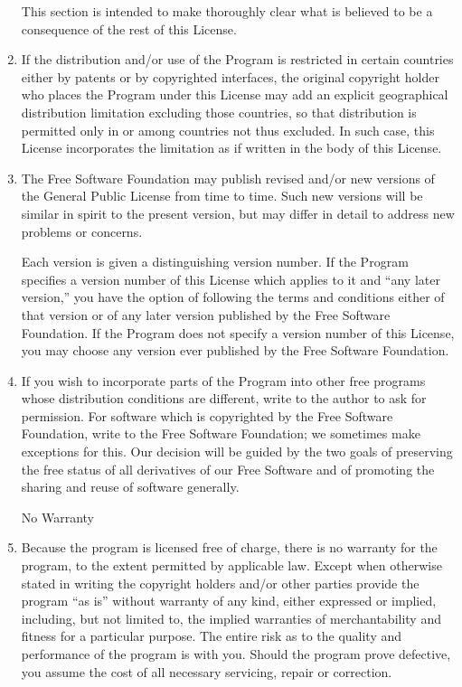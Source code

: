 \documentclass[11pt, letterpaper]{book}
\begin{document}
\begin{enumerate}
This section is intended to make thoroughly clear what is believed to
be a consequence of the rest of this License.

\item
If the distribution and/or use of the Program is restricted in
certain countries either by patents or by copyrighted interfaces, the
original copyright holder who places the Program under this License
may add an explicit geographical distribution limitation excluding
those countries, so that distribution is permitted only in or among
countries not thus excluded. In such case, this License incorporates
the limitation as if written in the body of this License.

\item
The Free Software Foundation may publish revised and/or new versions
of the General Public License from time to time. Such new versions will
be similar in spirit to the present version, but may differ in detail to
address new problems or concerns.

Each version is given a distinguishing version number. If the Program
specifies a version number of this License which applies to it and ``any
later version,'' you have the option of following the terms and conditions
either of that version or of any later version published by the Free
Software Foundation. If the Program does not specify a version number of
this License, you may choose any version ever published by the Free Software
Foundation.

\item
If you wish to incorporate parts of the Program into other free
programs whose distribution conditions are different, write to the author
to ask for permission. For software which is copyrighted by the Free
Software Foundation, write to the Free Software Foundation; we sometimes
make exceptions for this. Our decision will be guided by the two goals
of preserving the free status of all derivatives of our Free Software and
of promoting the sharing and reuse of software generally.

\begin{center}
{\Large\sc
No Warranty
}
\end{center}

\item
{\sc Because the program is licensed free of charge, there is no warranty
for the program, to the extent permitted by applicable law. Except when
otherwise stated in writing the copyright holders and/or other parties
provide the program ``as is'' without warranty of any kind, either expressed
or implied, including, but not limited to, the implied warranties of
merchantability and fitness for a particular purpose. The entire risk as
to the quality and performance of the program is with you. Should the
program prove defective, you assume the cost of all necessary servicing,
repair or correction.}


\end{enumerate}
\end{document}
